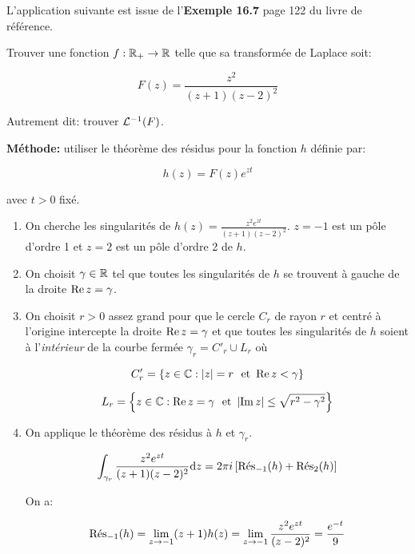 \begin{note}
    L'application suivante est issue de l'\textbf{Exemple 16.7} page 122 du livre de référence.
\end{note}

\begin{example}[3]
    Trouver une fonction $f: \R_+ \rightarrow \R$ telle que sa transformée de Laplace soit:
    
    \[ F(z) = \frac{z^2}{(z+1)(z-2)^2} \]
    
    Autrement dit: trouver $\TLi(F)$.
    
    \textbf{Méthode:} utiliser le théorème des résidus pour la fonction $h$ définie par:
    
    \[ h(z) = F(z) e^{zt} \]
    
    avec $t > 0$ fixé.
    
    \begin{enumerate}
        \item 
        On cherche les singularités de $h(z) = \frac{z^2 e^{zt}}{(z+1)(z-2)^2}$.
        $z = -1$ est un pôle d'ordre 1 et $z = 2$ est un pôle d'ordre 2 de $h$.
        
        \item 
        On choisit $\gamma \in \R$ tel que toutes les singularités de $h$ se trouvent à gauche de la droite $\Rep z = \gamma$.
        
        \item 
        On choisit $r > 0$ assez grand pour que le cercle $C_r$ de rayon $r$ et centré à l'origine intercepte la droite $\Rep z = \gamma$ et que toutes les singularités de $h$ soient à l'\textit{intérieur} de la courbe fermée $\gamma_r = C'_r \cup L_r$ où
        
        \[ C'_r = \left\{ z \in \Cx : |z| = r \ \textrm{ et } \Rep z < \gamma \right\} \]
        
        \[ L_r = \left\{ z \in \Cx : \Rep z = \gamma \ \textrm{ et } \module{\Imp z} \leq \sqrt{r^2 - \gamma^2} \right\} \]
        
        \item 
        On applique le théorème des résidus à $h$ et $\gamma_r$.
        
        \[ \int_{\gamma_r} \frac{z^2 e^{zt}}{(z+1)(z-2)^2} \dz = 2 \pi i \left[ \Res_{-1}(h) + \Res_2(h) \right] \]
        
        On a:
        
        \[
            \Res_{-1}(h)
            = \lim_{z \rightarrow -1} (z + 1) h(z)
            = \lim_{z \rightarrow -1} \frac{z^2 e^{zt}}{(z-2)^2}
            = \frac{e^{-t}}{9}
        \]
        

\end{enumerate}
\end{example}
